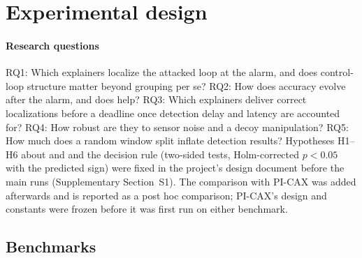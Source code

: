 \section{Experimental design}\label{sec:setup}

\paragraph{Research questions}
RQ1: Which explainers localize the attacked loop at the alarm, and does control-loop structure matter beyond grouping per se? RQ2: How does accuracy evolve after the alarm, and does \TEA{} help? RQ3: Which explainers deliver correct localizations before a deadline once detection delay and latency are accounted for? RQ4: How robust are they to sensor noise and a decoy manipulation? RQ5: How much does a random window split inflate detection results? Hypotheses H1--H6 about \LX{} and \TEA{} and the decision rule (two-sided tests, Holm-corrected $p<0.05$ with the predicted sign) were fixed in the project's design document before the main runs (Supplementary Section~S1). The comparison with PI-CAX was added afterwards and is reported as a post hoc comparison; PI-CAX's design and constants were frozen before it was first run on either benchmark.

\subsection{Benchmarks}
